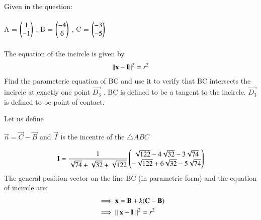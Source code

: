 \documentclass[journal,12pt,twocolumn]{IEEEtran}
\theoremstyle{remark}
\begin{document}


Given in the question:\\ \\
    A = $\begin{pmatrix}1\\-1\end{pmatrix}$  ,
    B = $\begin{pmatrix}-4\\6\end{pmatrix}$  ,
    C = $\begin{pmatrix}-3\\-5\end{pmatrix}$ \\
\\
The equation of the incircle is given by
\begin{align}
\left\lVert\mathbf{x}-\mathbf{I}\right\rVert^2 = r^2
\end{align}
Find the parameteric equation of BC and use it to verify that BC
intersects the incircle at exactly one point $\vec{D_{3}}$ . BC is defined to be a
tangent to the incircle. $\vec{D_{3}}$ is defined to be point of contact. 

Let us define 

$\vec{n} = \vec{C}-\vec{B}$ and $\vec{I}$ is the incentre of the $\bigtriangleup ABC$

\begin{align}
\mathbf{I} = \frac{1}{\sqrt{74}+\sqrt{32}+\sqrt{122}}\begin{pmatrix}{\sqrt{122}-4\sqrt{32}-3\sqrt{74}}\\{-\sqrt{122}+6\sqrt{32}-5\sqrt{74}}\end{pmatrix}
\end{align}
The general position vector on the line BC (in parametric form)  and the equation of incircle are:
\begin{align}
 &\implies \mathbf{x} = \mathbf{B} + k(\mathbf{C}-\mathbf{B})\\
 &\implies \left\lVert\ \mathbf{x} - \mathbf{I}\ \right\rVert^2 = r^2 
\end{align}
\end{document}

